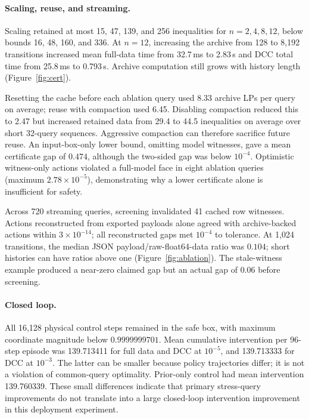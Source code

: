 \paragraph{Scaling, reuse, and streaming.}
Scaling retained at most 15, 47, 139, and 256 inequalities for $n=2,4,8,12$, below bounds 16, 48, 160, and 336. At $n=12$, increasing the archive from 128 to 8,192 transitions increased mean full-data time from 32.7\,ms to 2.83\,s and DCC total time from 25.8\,ms to 0.793\,s. Archive computation still grows with history length (Figure~\ref{fig:cert}).

Resetting the cache before each ablation query used 8.33 archive LPs per query on average; reuse with compaction used 6.45. Disabling compaction reduced this to 2.47 but increased retained data from 29.4 to 44.5 inequalities on average over short 32-query sequences. Aggressive compaction can therefore sacrifice future reuse. An input-box-only lower bound, omitting model witnesses, gave a mean certificate gap of $0.474$, although the two-sided gap was below $10^{-4}$. Optimistic witness-only actions violated a full-model face in eight ablation queries (maximum $2.78\times10^{-5}$), demonstrating why a lower certificate alone is insufficient for safety.

Across 720 streaming queries, screening invalidated 41 cached row witnesses. Actions reconstructed from exported payloads alone agreed with archive-backed actions within $3\times10^{-14}$; all reconstructed gaps met $10^{-4}$ to tolerance. At 1,024 transitions, the median JSON payload/raw-float64-data ratio was $0.104$; short histories can have ratios above one (Figure~\ref{fig:ablation}). The stale-witness example produced a near-zero claimed gap but an actual gap of $0.06$ before screening.

\paragraph{Closed loop.}
All 16,128 physical control steps remained in the safe box, with maximum coordinate magnitude below $0.9999999701$. Mean cumulative intervention per 96-step episode was 139.713411 for full data and DCC at $10^{-5}$, and 139.713333 for DCC at $10^{-3}$. The latter can be smaller because policy trajectories differ; it is not a violation of common-query optimality. Prior-only control had mean intervention 139.760339. These small differences indicate that primary stress-query improvements do not translate into a large closed-loop intervention improvement in this deployment experiment.
